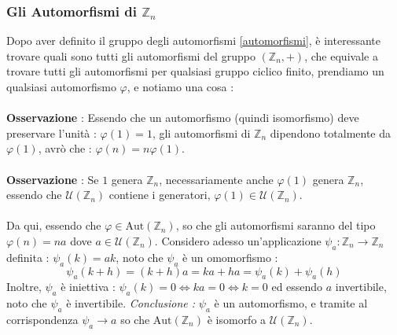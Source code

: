 \documentclass[12pt, letterpaper]{article}
\newcommand{\Z}{{\mathbb Z}}
\newcommand{\aut}{{\text{Aut}}}
\begin{document}
\subsubsection{Gli Automorfismi di \(\Z_n\)}
Dopo aver definito il gruppo degli automorfismi \ref{automorfismi}, è interessante trovare quali sono tutti gli 
automorfismi del gruppo \((\Z_n,+)\), che equivale a trovare tutti gli automorfismi per qualsiasi gruppo 
ciclico finito, prendiamo un qualsiasi automorfismo \(\varphi\), e notiamo una cosa :\\\hphantom{}\\      
\textbf{Osservazione} : Essendo che un automorfismo (quindi isomorfismo) deve preservare 
l'unità : \(\varphi(1)=1\), gli automorfismi di \(\Z_n\) dipendono totalmente da \(\varphi(1)\), avrò
che : \(\varphi(n)=n\varphi(1)\).
\\\hphantom{}\\      
\textbf{Osservazione} : Se \(1\) genera \(\Z_n\), necessariamente anche \(\varphi(1)\) genera \(\Z_n\), 
essendo che \(\mathcal{U}(\Z_n)\) contiene i generatori, \(\varphi(1)\in \mathcal{U}(\Z_n)\). \\\hphantom{}\\  
Da qui, essendo che \(\varphi\in\aut(\Z_n)\), so che gli automorfismi saranno del tipo \(\varphi(n)=na\) dove 
\(a\in\mathcal{U}(\Z_n)\). Considero adesso un'applicazione \(\psi_a : \Z_n\rightarrow \Z_n\) definita : 
\(\psi_a(k)=ak\), noto che \(\psi_a\) è un omomorfismo : \begin{equation}
    \psi_a(k+h)=(k+h)a=ka+ha=\psi_a(k)+\psi_a(h)
\end{equation}
Inoltre, \(\psi_a\) è iniettiva : \(\psi_a(k)=0\iff ka=0 \iff k=0\) ed essendo \(a\) invertibile, noto che 
\(\psi_a\) è invertibile. \textit{Conclusione :} \(\psi_a\) è un automorfismo, e tramite al corrispondenza 
\(\psi_a\rightarrow a\) so che \(\aut(\Z_n)\) è isomorfo a \(\mathcal{U}(\Z_n)\).
\end{document}
